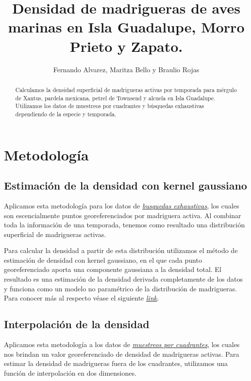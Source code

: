 \documentclass{article}
\author{Fernando Alvarez, Maritza Bello y Braulio Rojas}
\title{Densidad de madrigueras de aves marinas en Isla Guadalupe, Morro Prieto y Zapato.}
\begin{document}
\maketitle

\begin{abstract}
Calculamos la densidad superficial de madrigueras activas por temporada para mérgulo de Xantus, pardela mexicana, petrel de Townsend y alcuela en Isla Guadalupe. Utilizamos los datos de muestreos por cuadrantes y búsquedas exhaustivas dependiendo de la especie y temporada.
\end{abstract}


\section*{Metodología}
\subsection*{Estimación de la densidad con kernel gaussiano}

Aplicamos esta metodología para los datos de \href{https://drive.google.com/drive/folders/16HeQaiut3p1ONAw3YfAtu3V9A8JXH5ou}{{\color{blue}\textit{\underline{busquedas exhaustivas}}}}, los cuales son escencialmente puntos georeferenciados por madriguera activa. Al combinar toda la información de una temporada, tenemos como resultado una distribución superficial de madrigueras activas.

Para calcular la densidad a partir de esta distribución utilizamos el método de estimación de densidad con kernel gaussiano, en el que cada punto georeferenciado aporta una componente gaussiana a la densidad total. El resultado es una estimación de la densidad derivada completamente de los datos y funciona como un modelo no paramétrico de la distribución de madrigueras. Para conocer más al respecto véase el siguiente \href{https://scikit-learn.org/stable/modules/density.html#kernel-density}{{\color{blue}\textit{\underline{link}}}}.

\subsection*{Interpolación de la densidad}

Aplicamos esta metodología a los datos de \href{https://drive.google.com/drive/folders/1mG_Zvp9S36Bb45viOVwPmoJ-C4OrOpkr}{{\color{blue}\textit{\underline{muestreos por cuadrantes}}}}, los cuales nos brindan un valor georeferenciado de densidad de madrigueras activas. Para estimar la densidad de madrigueras fuera de los cuadrantes, utilizamos una función de interpolación en dos dimensiones. 
\end{document}
